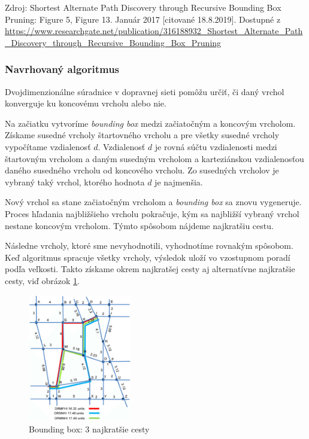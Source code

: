 \begin{footnotesize}
Zdroj: Shortest Alternate Path Discovery through Recursive Bounding Box Pruning: Figure 5, Figure 13. Január 2017 [citované 18.8.2019]. Dostupné z \url{https://www.researchgate.net/publication/316188932_Shortest_Alternate_Path_Discovery_through_Recursive_Bounding_Box_Pruning}
\end{footnotesize}

\subsubsection{Navrhovaný algoritmus}
Dvojdimenzionálne súradnice v dopravnej sieti pomôžu určiť, či daný vrchol konverguje ku koncovému vrcholu alebo nie. 

Na začiatku vytvoríme \textit{bounding box} medzi začiatočným a koncovým vrcholom. Získame susedné vrcholy štartovného vrcholu a pre všetky susedné vrcholy vypočítame vzdialenosť $d$. Vzdialenosť $d$ je rovná súčtu vzdialenosti medzi štartovným vrcholom a daným susedným vrcholom a karteziánskou vzdialenosťou daného susedného vrcholu od koncového vrcholu. Zo susedných vrcholov je vybraný taký vrchol, ktorého hodnota $d$ je najmenšia. 

Nový vrchol sa stane začiatočným vrcholom a \textit{bounding box} sa znovu vygeneruje. Proces hľadania najbližšieho vrcholu pokračuje, kým sa najbližší vybraný vrchol nestane koncovým vrcholom. Týmto spôsobom nájdeme najkratšiu cestu. 

Následne vrcholy, ktoré sme nevyhodnotili, vyhodnotíme rovnakým spôsobom. Keď algoritmus spracuje všetky vrcholy, výsledok uloží vo vzostupnom poradí podľa veľkosti. Takto získame okrem najkratšej cesty aj alternatívne najkratšie cesty, viď obrázok \ref{fig:boundingBoxResult}. 

\begin{figure}[H]
\centerline{\includegraphics[width=0.4\textwidth]{images/bounding-box-result}}
\caption[Bounding box: 3 najkratšie cesty]{Bounding box: 3 najkratšie cesty}
\label{fig:boundingBoxResult}
\end{figure}

